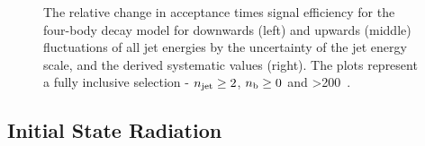 \begin{figure}[ht!]
  \caption{The relative change in acceptance times signal efficiency for the
  four-body decay model for downwards (left) and upwards (middle) fluctuations
  of all jet energies by the uncertainty of the jet energy scale, and the 
  derived systematic values (right). The plots represent a fully inclusive
  selection - $n_{\text{jet}} \geq 2$, $n_{\text{b}} \geq 0$ and \HT>200~\gev.}
  \label{fig:sms-jes-t2degen}
\end{figure}


\newpage
\subsection*{Initial State Radiation}
\label{sec:t2degen_isr_plots}


